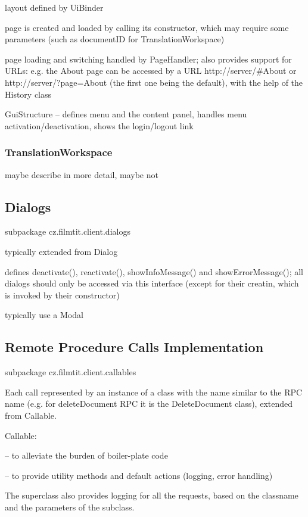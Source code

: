 layout defined by UiBinder

page is created and loaded by calling its constructor, which may require some parameters (such as documentID for TranslationWorkspace)

page loading and switching handled by PageHandler; also provides support for URLs: e.g. the About page can be accessed by a URL http://server/\#About or http://server/?page=About (the first one being the default), with the help of the History class

GuiStructure -- defines menu and the content panel, handles menu activation/deactivation, shows the login/logout link

\subsubsection{TranslationWorkspace}

maybe describe in more detail, maybe not

\subsection{Dialogs}

subpackage cz.filmtit.client.dialogs

typically extended from Dialog

defines deactivate(), reactivate(), showInfoMessage() and showErrorMessage(); all dialogs should only be accessed via this interface (except for their creatin, which is invoked by their constructor)

typically use a Modal 

\subsection{Remote Procedure Calls Implementation}

subpackage cz.filmtit.client.callables

Each call represented by an instance of a class with the name similar to the RPC name (e.g. for deleteDocument RPC it is the DeleteDocument class), extended from Callable.

Callable:

-- to alleviate the burden of boiler-plate code

-- to provide utility methods and default actions (logging, error handling)

The superclass also provides logging for all the requests, based on the classname and the parameters of the subclass.

